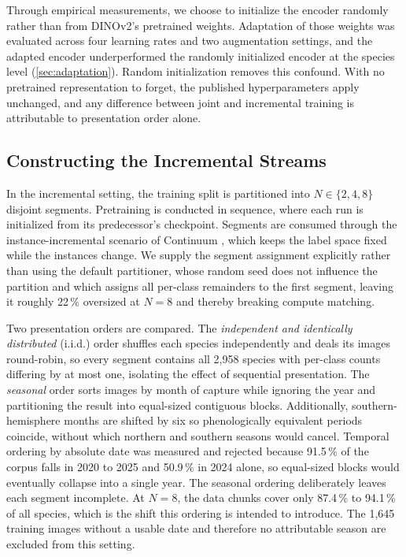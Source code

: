 \documentclass[english]{lni}
\begin{document}
Through empirical measurements, we choose to initialize the encoder randomly rather than from DINOv2's pretrained weights. Adaptation of those weights was evaluated across four learning rates and two augmentation settings, and the adapted encoder underperformed the randomly initialized encoder at the species level (\cref{sec:adaptation}). Random initialization removes this confound. With no pretrained representation to forget, the published hyperparameters apply unchanged, and any difference between joint and incremental training is attributable to presentation order alone.

\subsection{Constructing the Incremental Streams}\label{sec:streams}

In the incremental setting, the training split is partitioned into $N \in \{2,4,8\}$ disjoint segments. Pretraining is conducted in sequence, where each run is initialized from its predecessor's checkpoint. Segments are consumed through the instance-incremental scenario of Continuum \cite{Douillard2021}, which keeps the label space fixed while the instances change. We supply the segment assignment explicitly rather than using the default partitioner, whose random seed does not influence the partition and which assigns all per-class remainders to the first segment, leaving it roughly 22\,\% oversized at $N=8$ and thereby breaking compute matching.

Two presentation orders are compared. The \emph{independent and identically distributed} (i.i.d.) order shuffles each species independently and deals its images round-robin, so every segment contains all 2,958 species with per-class counts differing by at most one, isolating the effect of sequential presentation. The \emph{seasonal} order sorts images by month of capture while ignoring the year and partitioning the result into equal-sized contiguous blocks. Additionally, southern-hemisphere months are shifted by six so phenologically equivalent periods coincide, without which northern and southern seasons would cancel. Temporal ordering by absolute date was measured and rejected because 91.5\,\% of the corpus falls in 2020 to 2025 and 50.9\,\% in 2024 alone, so equal-sized blocks would eventually collapse into a single year. The seasonal ordering deliberately leaves each segment incomplete. At $N=8$, the data chunks cover only 87.4\,\% to 94.1\,\% of all species, which is the shift this ordering is intended to introduce. The 1,645 training images without a usable date and therefore no attributable season are excluded from this setting.
\end{document}
